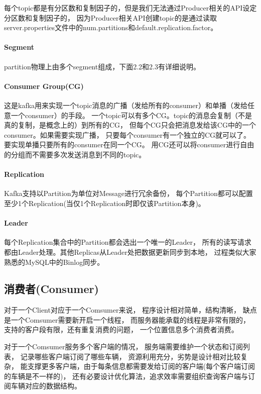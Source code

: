 \documentclass{book}
\begin{document}
每个topic都是有分区数和复制因子的，但是我们无法通过Producer相关的API设定分区数和复制因子的，
因为Producer相关API创建topic的是通过读取server.properties文件中的num.partitions和default.replication.factor。

\paragraph{Segment}

partition物理上由多个segment组成，下面2.2和2.3有详细说明。

\paragraph{Consumer Group(CG)}

这是kafka用来实现一个topic消息的广播（发给所有的consumer）和单播（发给任意一个consumer）的手段。
一个topic可以有多个CG。topic的消息会复制（不是真的复制，是概念上的）到所有的CG，
但每个CG只会把消息发给该CG中的一个 consumer。如果需要实现广播，
只要每个consumer有一个独立的CG就可以了。要实现单播只要所有的consumer在同一个CG。
用CG还可以将consumer进行自由的分组而不需要多次发送消息到不同的topic。

\paragraph{Replication}

Kafka支持以Partition为单位对Message进行冗余备份，
每个Partition都可以配置至少1个Replication(当仅1个Replication时即仅该Partition本身)。

\paragraph{Leader}

每个Replication集合中的Partition都会选出一个唯一的Leader，
所有的读写请求都由Leader处理。其他Replicas从Leader处把数据更新同步到本地，
过程类似大家熟悉的MySQL中的Binlog同步。

\subsection{消费者(Consumer)}

对于一个Client对应于一个Comsumer来说，
程序设计相对简单，结构清晰，
缺点是一个Comsumer需要新开启一个线程，
而服务器能承载的线程是非常有限的，
支持的客户段有限，还有重复消费的问题，
一个位置信息多个消费者消费。

对于一个Comsumer服务多个客户端的情况，
服务端需要维护一个状态和订阅列表，
记录哪些客户端订阅了哪些车辆，
资源利用充分，劣势是设计相对比较复杂，
能支撑更多客户端，由于每条信息都需要发给订阅的客户端(每个客户端订阅的车辆是不一样的)，
还有必要设计优化算法，追求效率需要组织查询客户端与订阅车辆对应的数据结构。
\end{document}
